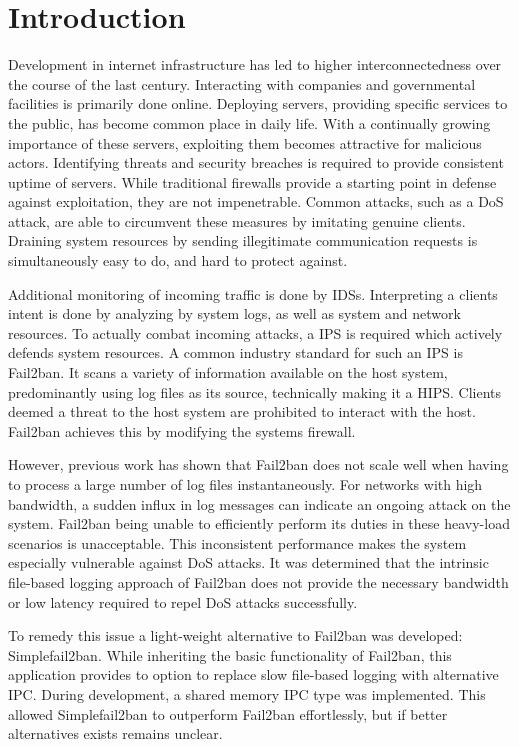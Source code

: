 %
%

\chapter{Introduction}
\label{cha:introduction}
Development in internet infrastructure has led to higher interconnectedness over the course of the last century.
Interacting with companies and governmental facilities is primarily done online.
Deploying servers, providing specific services to the public, has become common place in daily life.
With a continually growing importance of these servers, exploiting them becomes attractive for malicious actors.
Identifying threats and security breaches is required to provide consistent uptime of servers.
While traditional firewalls provide a starting point in defense against exploitation, they are not impenetrable.
Common attacks, such as a \ac{DoS} attack, are able to circumvent these measures by imitating genuine clients.
Draining system resources by sending illegitimate communication requests is simultaneously easy to do, and hard to protect against.

Additional monitoring of incoming traffic is done by \ac{IDSs}.
Interpreting a clients intent is done by analyzing by system logs, as well as system and network resources.
To actually combat incoming attacks, a \ac{IPS} is required which actively defends system resources.
A common industry standard for such an \ac{IPS} is Fail2ban\cite{git:fail2ban}.
It scans a variety of information available on the host system, predominantly using log files as its source, technically making it a \ac{HIPS}.
Clients deemed a threat to the host system are prohibited to interact with the host.
Fail2ban achieves this by modifying the systems firewall.

However, previous work has shown that Fail2ban does not scale well when having to process a large number of log files instantaneously\cite{mikolajczak:ebpf}.
For networks with high bandwidth, a sudden influx in log messages can indicate an ongoing attack on the system.
Fail2ban being unable to efficiently perform its duties in these heavy-load scenarios is unacceptable.
This inconsistent performance makes the system especially vulnerable against \ac{DoS} attacks.
It was determined that the intrinsic file-based logging approach of Fail2ban does not provide the necessary bandwidth or low latency required to repel \ac{DoS} attacks successfully.

To remedy this issue a light-weight alternative to Fail2ban was developed: Simplefail2ban\cite{raatschen:ipc}.
While inheriting the basic functionality of Fail2ban, this application provides to option to replace slow file-based logging with alternative \ac{IPC}.
During development, a shared memory \ac{IPC} type was implemented.
This allowed Simplefail2ban to outperform Fail2ban effortlessly\cite{raatschen:ipc}, but if better alternatives exists remains unclear.

